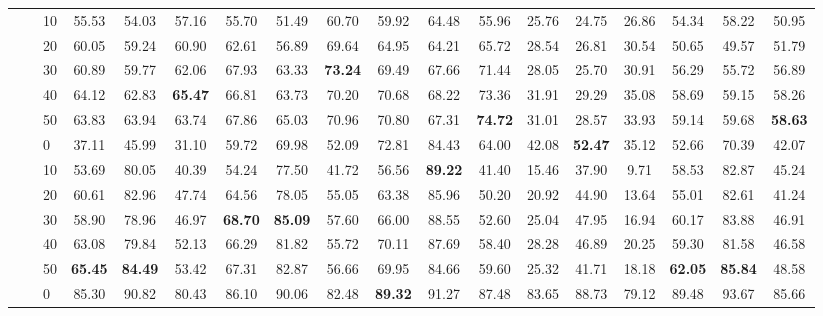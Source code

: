 \begin{table*}[!h]
{\begin{tabular}{lllccc|ccc|ccc|ccc|ccc}
 \textbf{} & \textbf{} & 10 & 55.53 & 54.03 & 57.16 & 55.70 & 51.49 & 60.70 & 59.92 & 64.48 & 55.96 & 25.76 & 24.75 & 26.86 & 54.34 & 58.22 & 50.95 \\ 
 \textbf{} & \textbf{} & 20 & 60.05 & 59.24 & 60.90 & 62.61 & 56.89 & 69.64 & 64.95 & 64.21 & 65.72 & 28.54 & 26.81 & 30.54 & 50.65 & 49.57 & 51.79 \\ 
 \textbf{} & \textbf{} & 30 & 60.89 & 59.77 & 62.06 & 67.93 & 63.33 & \textbf{73.24} & 69.49 & 67.66 & 71.44 & 28.05 & 25.70 & 30.91 & 56.29 & 55.72 & 56.89 \\ 
 \textbf{} & \textbf{} & 40 & 64.12 & 62.83 & \textbf{65.47} & 66.81 & 63.73 & 70.20 & 70.68 & 68.22 & 73.36 & 31.91 & 29.29 & 35.08 & 58.69 & 59.15 & 58.26 \\ 
 \textbf{} & \textbf{} & 50 & 63.83 & 63.94 & 63.74 & 67.86 & 65.03 & 70.96 & 70.80 & 67.31 & \textbf{74.72} & 31.01 & 28.57 & 33.93 & 59.14 & 59.68 & \textbf{58.63} \\ 
 \arrayrulecolor{gray}\cline{2-18}\arrayrulecolor{black}
\textbf{} & \textbf{\multirow{6}{*}{SC}} & 0 & 37.11 & 45.99 & 31.10 & 59.72 & 69.98 & 52.09 & 72.81 & 84.43 & 64.00 & 42.08 & \textbf{52.47} & 35.12 & 52.66 & 70.39 & 42.07 \\ 
 \textbf{} & \textbf{} & 10 & 53.69 & 80.05 & 40.39 & 54.24 & 77.50 & 41.72 & 56.56 & \textbf{89.22} & 41.40 & 15.46 & 37.90 & 9.71 & 58.53 & 82.87 & 45.24 \\ 
 \textbf{} & \textbf{} & 20 & 60.61 & 82.96 & 47.74 & 64.56 & 78.05 & 55.05 & 63.38 & 85.96 & 50.20 & 20.92 & 44.90 & 13.64 & 55.01 & 82.61 & 41.24 \\ 
 \textbf{} & \textbf{} & 30 & 58.90 & 78.96 & 46.97 & \textbf{68.70} & \textbf{85.09} & 57.60 & 66.00 & 88.55 & 52.60 & 25.04 & 47.95 & 16.94 & 60.17 & 83.88 & 46.91 \\ 
 \textbf{} & \textbf{} & 40 & 63.08 & 79.84 & 52.13 & 66.29 & 81.82 & 55.72 & 70.11 & 87.69 & 58.40 & 28.28 & 46.89 & 20.25 & 59.30 & 81.58 & 46.58 \\ 
 \textbf{} & \textbf{} & 50 & \textbf{65.45} & \textbf{84.49} & 53.42 & 67.31 & 82.87 & 56.66 & 69.95 & 84.66 & 59.60 & 25.32 & 41.71 & 18.18 & \textbf{62.05} & \textbf{85.84} & 48.58 \\ 
\hline
\arrayrulecolor{gray}\cline{2-18}\arrayrulecolor{black}
\textbf{\multirow{12}{*}{Sentiment Polarity}} & \textbf{\multirow{6}{*}{-}} & 0 & 85.30 & 90.82 & 80.43 & 86.10 & 90.06 & 82.48 & \textbf{89.32} & 91.27 & 87.48 & 83.65 & 88.73 & 79.12 & 89.48 & 93.67 & 85.66 \\ 

\end{tabular}}
\end{table*}
